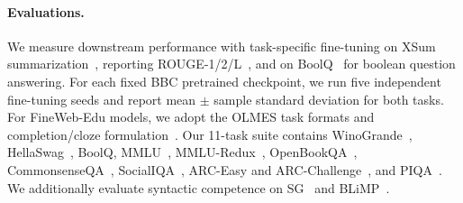 \documentclass[11pt]{article}
\begin{document}
\paragraph{Evaluations.} We measure downstream performance with task-specific fine-tuning on XSum summarization~\cite{narayan-etal-2018-dont}, reporting ROUGE-1/2/L~\cite{lin-2004-rouge}, and on BoolQ~\cite{clark-etal-2019-boolq} for boolean question answering. For each fixed BBC pretrained checkpoint, we run five independent fine-tuning seeds and report mean $\pm$ sample standard deviation for both tasks. For FineWeb-Edu models, we adopt the OLMES task formats and completion/cloze formulation~\cite{gu-etal-2025-olmes}. Our 11-task suite contains WinoGrande~\cite{sakaguchi2020winogrande}, HellaSwag~\cite{zellers-etal-2019-hellaswag}, BoolQ, MMLU~\cite{hendrycks2021measuring}, MMLU-Redux~\cite{gema-etal-2025-done}, OpenBookQA~\cite{mihaylov-etal-2018-suit}, CommonsenseQA~\cite{talmor-etal-2019-commonsenseqa}, SocialIQA~\cite{sap-etal-2019-social}, ARC-Easy and ARC-Challenge~\cite{clark2018think}, and PIQA~\cite{bisk2020piqa}. We additionally evaluate syntactic competence on SG~\cite{hu-etal-2020-systematic} and BLiMP~\cite{warstadt-etal-2020-blimp-benchmark}.
\end{document}
